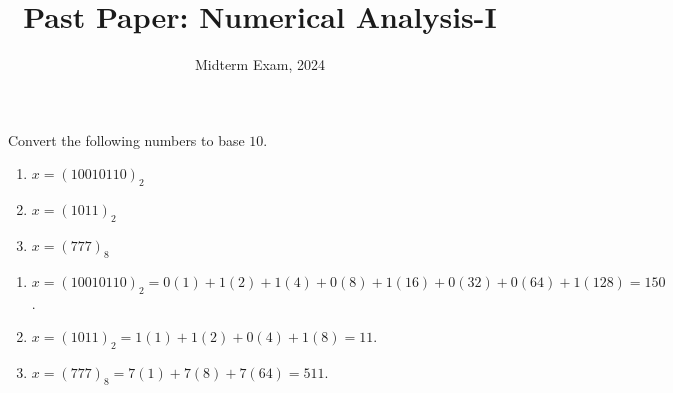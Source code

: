 \documentclass[11pt]{penrose}
\title{Past Paper: Numerical Analysis-I}
\subtitle{Midterm Exam, 2024}
\begin{document}
\maketitle
\warningtext

\begin{problem}{1}
    Convert the following numbers to base $10$.
    \begin{enumerate}[label=(\alph*)]
        \item $x = (10 010 110)_2$
        \item $x = (1 011)_2$
        \item $x = (777)_8$
    \end{enumerate}

    \solution \phantom{}
    \begin{enumerate}[label=(\alph*)]
        \item $x = (10 010 110)_2 = 0(1) + 1(2) + 1(4) + 0(8) + 1(16) + 0(32) + 0(64) + 1(128) = 150$.
        \item $x = (1 011)_2 = 1(1) + 1(2) + 0(4) + 1(8) = 11$.
        \item $x = (777)_8 = 7(1) + 7(8) + 7(64) = 511$.
    \end{enumerate}
\end{problem}
\end{document}
